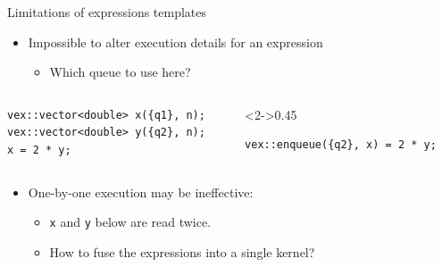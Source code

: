\documentclass[@BEAMER_OPTIONS@]{beamer}
\newcommand{\code}[1]{\lstinline|#1|}
\begin{document}
\begin{frame}[fragile]{Limitations of expressions templates}
    \begin{itemize}
        \item Impossible to alter execution details for an expression
            \begin{itemize}
                \item Which queue to use here?
            \end{itemize}
    \end{itemize}
    \begin{columns}
        \begin{column}{0.45\textwidth}
            \begin{exampleblock}{}
                \begin{lstlisting}
vex::vector<double> x({q1}, n);
vex::vector<double> y({q2}, n);
x = 2 * y;
                \end{lstlisting}
            \end{exampleblock}
        \end{column}
        \begin{column}<2->{0.45\textwidth}
            \begin{exampleblock}{}
                \begin{lstlisting}[numbers=none]
vex::enqueue({q2}, x) = 2 * y;
                \end{lstlisting}
            \end{exampleblock}
        \end{column}
    \end{columns}
    \vspace{\baselineskip}
    \begin{itemize}
        \item One-by-one execution may be ineffective:
            \begin{itemize}
                \item \code{x} and \code{y} below are read twice.
                \item How to fuse the expressions into a single kernel?
            \end{itemize}
    \end{itemize}
    \begin{columns}
        \begin{column}{0.45\textwidth}
            \begin{exampleblock}{}
                \begin{lstlisting}

\end{lstlisting}
\end{exampleblock}
\end{column}
\end{columns}
\end{frame}
\end{document}

